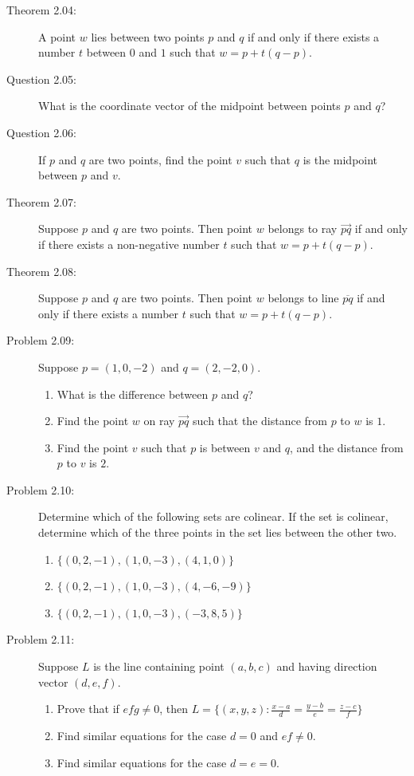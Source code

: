 \documentclass{article}
\begin{document}
\begin{description}
  \item[Theorem 2.04:] A point $w$ lies between two points $p$ and $q$ if and only if there exists a number $t$ between $0$ and $1$ such that $w=p+t(q-p)$.

  \item[Question 2.05:] What is the coordinate vector of the midpoint between points $p$ and $q$?

  \item[Question 2.06:] If $p$ and $q$ are two points, find the point $v$ such that $q$ is the midpoint between $p$ and $v$.

  \item[Theorem 2.07:] Suppose $p$ and $q$ are two points. Then point $w$ belongs to ray $\overrightarrow{pq}$ if and only if there exists a non-negative number $t$ such that $w=p+t(q-p)$.

  \item[Theorem 2.08:] Suppose $p$ and $q$ are two points. Then point $w$ belongs to line $\overline{pq}$ if and only if there exists a number $t$ such that $w=p+t(q-p)$.

  \item[Problem 2.09:] Suppose $p=(1,0,-2)$ and $q=(2,-2,0)$.
    \begin{enumerate}[\hspace{1cm}(a)]
      \item What is the difference between $p$ and $q$?
      \item Find the point $w$ on ray $\overrightarrow{pq}$ such that the distance from $p$ to $w$ is $1$.
      \item Find the point $v$ such that $p$ is between $v$ and $q$, and the distance from $p$ to $v$ is $2$.
    \end{enumerate}

  \item[Problem 2.10:] Determine which of the following sets are colinear. If the set is colinear, determine which of the three points in the set lies between the other two.
    \begin{enumerate}[\hspace{1cm}(a)]
      \item $\{ (0,2,-1), (1,0,-3), (4,1,0) \}$
      \item $\{ (0,2,-1), (1,0,-3), (4,-6,-9) \}$
      \item $\{ (0,2,-1), (1,0,-3), (-3,8,5) \}$
    \end{enumerate}

  \item[Problem 2.11:] Suppose $L$ is the line containing point $(a,b,c)$ and having direction vector $(d,e,f)$.
    \begin{enumerate}[\hspace{1cm}(a)]
      \item Prove that if $efg \neq 0$, then $L=\{ (x,y,z): \frac{x-a}{d} = \frac{y-b}{e} = \frac{z-c}{f} \}$
      \item Find similar equations for the case $d=0$ and $ef\neq 0$.
      \item Find similar equations for the case $d=e=0$.
    \end{enumerate}


\end{description}
\end{document}
